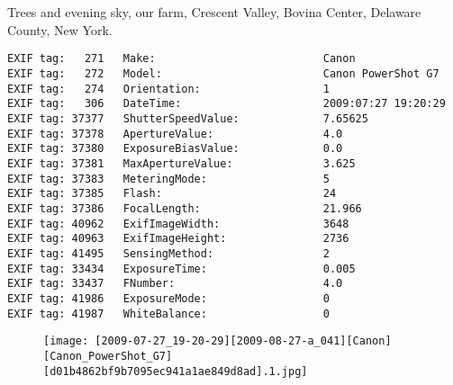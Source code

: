 \section{\protect{}}
\noindent Trees and evening sky, our farm, Crescent Valley, Bovina Center, Delaware County, New York.
\noindent
\begin{lstlisting}
EXIF tag:   271   Make:                          Canon
EXIF tag:   272   Model:                         Canon PowerShot G7
EXIF tag:   274   Orientation:                   1
EXIF tag:   306   DateTime:                      2009:07:27 19:20:29
EXIF tag: 37377   ShutterSpeedValue:             7.65625
EXIF tag: 37378   ApertureValue:                 4.0
EXIF tag: 37380   ExposureBiasValue:             0.0
EXIF tag: 37381   MaxApertureValue:              3.625
EXIF tag: 37383   MeteringMode:                  5
EXIF tag: 37385   Flash:                         24
EXIF tag: 37386   FocalLength:                   21.966
EXIF tag: 40962   ExifImageWidth:                3648
EXIF tag: 40963   ExifImageHeight:               2736
EXIF tag: 41495   SensingMethod:                 2
EXIF tag: 33434   ExposureTime:                  0.005
EXIF tag: 33437   FNumber:                       4.0
EXIF tag: 41986   ExposureMode:                  0
EXIF tag: 41987   WhiteBalance:                  0

\end{lstlisting}
\clearpage
\begin{figure}
\raggedleft
\texttt{[image: [2009-07-27\_19-20-29][2009-08-27-a\_041][Canon][Canon\_PowerShot\_G7][d01b4862bf9b7095ec941a1ae849d8ad].1.jpg]}
\end{figure}


\clearpage
